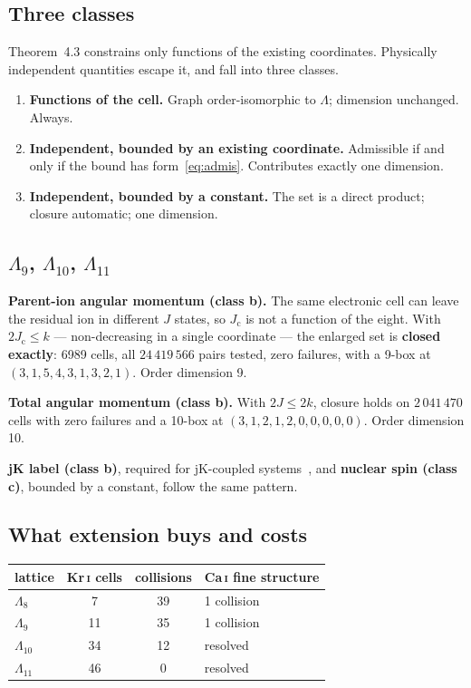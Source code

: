 \documentclass[11pt,a4paper]{article}
\theoremstyle{definition}
\newcommand{\Lm}{\ensuremath{\Lambda}}
\newcommand{\Jc}{\ensuremath{J_{\mathrm{c}}}}
\begin{document}
\subsection{Three classes}
Theorem~4.3 constrains only functions of the existing coordinates. Physically
independent quantities escape it, and fall into three classes.
\begin{enumerate}[label=(\alph*),leftmargin=*,itemsep=1pt]
\item \textbf{Functions of the cell.} Graph order-isomorphic to \Lm{}; dimension
unchanged. Always.
\item \textbf{Independent, bounded by an existing coordinate.} Admissible if and
only if the bound has form~\eqref{eq:admis}. Contributes exactly one dimension.
\item \textbf{Independent, bounded by a constant.} The set is a direct product;
closure automatic; one dimension.
\end{enumerate}

\subsection{$\Lambda_{9}$, $\Lambda_{10}$, $\Lambda_{11}$}
\textbf{Parent-ion angular momentum (class b).} The same electronic cell can
leave the residual ion in different $J$ states, so \Jc{} is not a function of
the eight. With $2\Jc\le k$ --- non-decreasing in a single coordinate --- the
enlarged set is \textbf{closed exactly}: 6989 cells, all $24\,419\,566$ pairs
tested, zero failures, with a 9-box at $(3,1,5,4,3,1,3,2,1)$. Order dimension 9.

\textbf{Total angular momentum (class b).} With $2J\le2k$, closure holds on
$2\,041\,470$ cells with zero failures and a 10-box at
$(3,1,2,1,2,0,0,0,0,0)$. Order dimension 10.

\textbf{jK label (class b)}, required for jK-coupled
systems~\cite{cowan,condonshortley}, and \textbf{nuclear spin (class c)},
bounded by a constant, follow the same pattern.

\subsection{What extension buys and costs}
\begin{center}\small
\begin{tabular}{@{}lccl@{}}
\toprule
lattice & Kr\,\textsc{i} cells & collisions & Ca\,\textsc{i} fine structure\\
\midrule
$\Lambda_{8}$  & 7  & 39 & 1 collision\\
$\Lambda_{9}$  & 11 & 35 & 1 collision\\
$\Lambda_{10}$ & 34 & 12 & resolved\\
$\Lambda_{11}$ & 46 & 0  & resolved\\
\bottomrule
\end{tabular}
\end{center}
\vspace{2mm}
\end{document}

